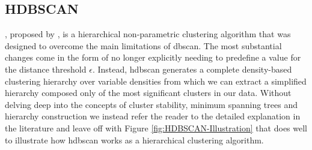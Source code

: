 \subsection{HDBSCAN}
\label{subsec:Background-Information:Clustering-Algorithms:HDBSCAN}
, proposed by \citet{Campello}, is a hierarchical non-parametric clustering algorithm that was designed to overcome the main limitations of \gls{dbscan}. The most substantial changes come in the form of no longer explicitly needing to predefine a value for the distance threshold $\epsilon$. Instead, \gls{hdbscan} generates a complete density-based clustering hierarchy over variable densities from which we can extract a simplified hierarchy composed only of the most significant clusters in our data. Without delving deep into the concepts of cluster stability, minimum spanning trees and hierarchy construction we instead refer the reader to the detailed explanation in the literature \cite{Campello} and leave off with Figure \ref{fig:HDBSCAN-Illustration} that does well to illustrate how \gls{hdbscan} works as a hierarchical clustering algorithm.

